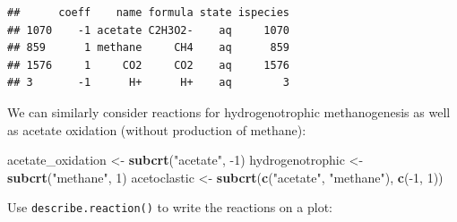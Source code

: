 \documentclass[]{tufte-book}
\newenvironment{Shaded}{}{}
\newcommand{\KeywordTok}[1]{\textcolor[rgb]{0.00,0.44,0.13}{\textbf{#1}}}
\newcommand{\DecValTok}[1]{\textcolor[rgb]{0.25,0.63,0.44}{#1}}
\newcommand{\StringTok}[1]{\textcolor[rgb]{0.25,0.44,0.63}{#1}}
\newcommand{\OperatorTok}[1]{\textcolor[rgb]{0.40,0.40,0.40}{#1}}
\newcommand{\NormalTok}[1]{#1}
\begin{document}
\begin{verbatim}
##      coeff    name formula state ispecies
## 1070    -1 acetate C2H3O2-    aq     1070
## 859      1 methane     CH4    aq      859
## 1576     1     CO2     CO2    aq     1576
## 3       -1      H+      H+    aq        3
\end{verbatim}

We can similarly consider reactions for hydrogenotrophic methanogenesis
as well as acetate oxidation (without production of methane):

\begin{Shaded}
\begin{Highlighting}[]
\NormalTok{acetate_oxidation <-}\StringTok{ }\KeywordTok{subcrt}\NormalTok{(}\StringTok{"acetate"}\NormalTok{, }\OperatorTok{-}\DecValTok{1}\NormalTok{)}
\NormalTok{hydrogenotrophic <-}\StringTok{ }\KeywordTok{subcrt}\NormalTok{(}\StringTok{"methane"}\NormalTok{, }\DecValTok{1}\NormalTok{)}
\NormalTok{acetoclastic <-}\StringTok{ }\KeywordTok{subcrt}\NormalTok{(}\KeywordTok{c}\NormalTok{(}\StringTok{"acetate"}\NormalTok{, }\StringTok{"methane"}\NormalTok{), }\KeywordTok{c}\NormalTok{(}\OperatorTok{-}\DecValTok{1}\NormalTok{, }\DecValTok{1}\NormalTok{))}
\end{Highlighting}
\end{Shaded}

Use {\texttt{describe.reaction()}} to write the reactions on a plot:
\end{document}
